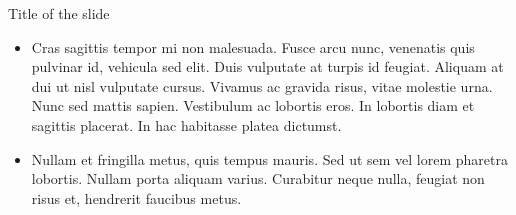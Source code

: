 \documentclass[russian,12pt,aspectratio=169,xcolor=table]{beamer}
\begin{document}
\makethanks

\begin{frame}
\end{frame}

\appendix

\begin{frame}{Title of the slide}
		\begin{itemize}	
			\item Cras sagittis tempor mi non malesuada. Fusce arcu nunc, venenatis quis pulvinar id, vehicula sed elit. Duis vulputate at turpis id feugiat. Aliquam at dui ut nisl vulputate cursus. Vivamus ac gravida risus, vitae molestie urna. Nunc sed mattis sapien. Vestibulum ac lobortis eros. In lobortis diam et sagittis placerat. In hac habitasse platea dictumst. 
			\item Nullam et fringilla metus, quis tempus mauris. Sed ut sem vel lorem pharetra lobortis. Nullam porta aliquam varius. Curabitur neque nulla, feugiat non risus et, hendrerit faucibus metus. 
		\end{itemize}
\end{frame}
\end{document}

